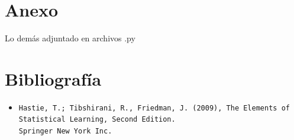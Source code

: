 \documentclass[10pt]{article}
\begin{document}
 
\section{Anexo}

%

Lo demás adjuntado en archivos .py

\section{Bibliografía}
\begin{itemize}
\item \begin{verbatim}
Hastie, T.; Tibshirani, R., Friedman, J. (2009), The Elements of Statistical Learning, Second Edition.
Springer New York Inc.
\end{verbatim}
\end{itemize}
\end{document}
